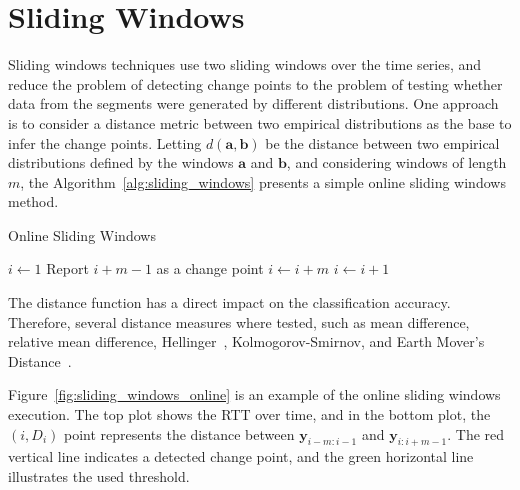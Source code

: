 \section{Sliding Windows}

Sliding windows techniques use two sliding windows over the time series, and
reduce the problem of detecting change points to the problem of testing whether
data from the segments were generated by different distributions. One approach
is to consider a distance metric between two empirical distributions as the base
to infer the change points. Letting $d(\mathbf{a}, \mathbf{b})$ be the distance
between two empirical distributions defined by the windows $\mathbf{a}$ and
$\mathbf{b}$, and considering windows of length $m$, the
Algorithm~\ref{alg:sliding_windows} presents a simple online sliding windows
method.

\begin{algorithm}[H]
\caption{Online Sliding Windows}
\label{alg:sliding_windows}
    \begin{algorithmic}[1]
        \State{} $i \gets 1$
                \State{} Report $i + m - 1$ as a change point
                \State{} $i \gets i + m$
             \Else{}
                \State{} $i \gets i + 1$
             \EndIf{}
        \EndWhile{}
    \end{algorithmic}
\end{algorithm}

The distance
function has a direct impact on the classification accuracy.
Therefore, several
distance measures where tested, such as mean difference, relative mean
difference,
Hellinger~\cite{hellinger_distance}, Kolmogorov-Smirnov, and
Earth Mover's
Distance~\cite{the_earth_movers_distance_as_a_metric_for_image_retrieval}.

Figure~\ref{fig:sliding_windows_online} is an example of the online sliding
windows execution. The top plot
shows the RTT over time, and in
the bottom plot, the $(i, D_{i})$ point represents the distance between
$\mathbf{y}_{i - m : i - 1}$ and $\mathbf{y}_{i : i + m - 1}$. The red vertical
line indicates a detected change point, and the green horizontal line
illustrates the used threshold.

